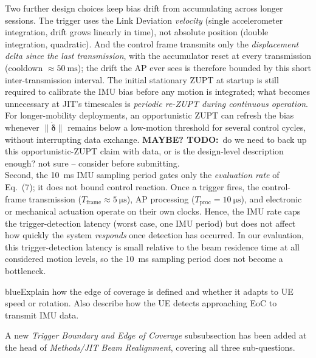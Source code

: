\documentclass{article}
\newcommand{\blue}[1]{\begin{color}{blue}#1\end{color}}
\newcommand{\todo}[1]{\textcolor{todopurple}{\textbf{MAYBE? TODO:}~#1}}
\begin{document}
\noindent Two further design choices keep bias drift from accumulating across longer sessions. The trigger uses the Link Deviation \emph{velocity} (single accelerometer integration, drift grows linearly in time), not absolute position (double integration, quadratic). And the control frame transmits only the \emph{displacement delta since the last transmission}, with the accumulator reset at every transmission (cooldown $\approx \SI{50}{\milli\second}$); the drift the AP ever sees is therefore bounded by this short inter-transmission interval. The initial stationary ZUPT at startup is still required to calibrate the IMU bias before any motion is integrated; what becomes unnecessary at JIT's timescales is \emph{periodic re-ZUPT during continuous operation}. For longer-mobility deployments, an opportunistic ZUPT can refresh the bias whenever $\|\dot{\boldsymbol\delta}\|$ remains below a low-motion threshold for several control cycles, without interrupting data exchange. \todo{do we need to back up this opportunistic-ZUPT claim with data, or is the design-level description enough? not sure -- consider before submitting.}\\

\noindent Second, the \SI{10}{\milli\second} IMU sampling period gates only the \emph{evaluation rate} of Eq.~(7); it does not bound control reaction. Once a trigger fires, the control-frame transmission ($T_{\text{frame}} \approx \SI{5}{\micro\second}$), AP processing ($T_{\text{proc}} = \SI{10}{\micro\second}$), and electronic or mechanical actuation operate on their own clocks. Hence, the IMU rate caps the trigger-detection latency (worst case, one IMU period) but does not affect how quickly the system \emph{responds} once detection has occurred. In our evaluation, this trigger-detection latency is small relative to the beam residence time at all considered motion levels, so the \SI{10}{\milli\second} sampling period does not become a bottleneck.

\begin{tcbremark}
{\selectfont
\blue{Explain how the edge of coverage is defined and whether it adapts to UE speed or rotation. Also describe how the UE detects approaching EoC to transmit IMU data.}
}
\end{tcbremark}

\noindent A new \emph{Trigger Boundary and Edge of Coverage} subsubsection has been added at the head of \emph{Methods/JIT Beam Realignment}, covering all three sub-questions.\\
\end{document}
